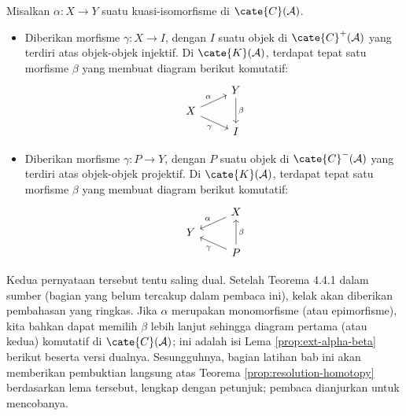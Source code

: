 \begin{teorema}\label{prop:resolution-homotopy}
	Misalkan $\alpha: X \to Y$ suatu kuasi-isomorfisme di $\cate{C}(\mathcal{A})$.
	\begin{itemize}
		\item Diberikan morfisme $\gamma: X \to I$, dengan $I$ suatu objek di $\cate{C}^+(\mathcal{A})$ yang terdiri atas objek-objek injektif. Di $\cate{K}(\mathcal{A})$, terdapat tepat satu morfisme $\beta$ yang membuat diagram berikut komutatif:
		\[\begin{tikzcd}[row sep=tiny]
			& Y \arrow[dd, "\beta"] \\
			X \arrow[ru, "\alpha"] \arrow[rd, "\gamma"'] & \\
			& I
		\end{tikzcd}\]
		\item Diberikan morfisme $\gamma: P \to Y$, dengan $P$ suatu objek di $\cate{C}^-(\mathcal{A})$ yang terdiri atas objek-objek projektif. Di $\cate{K}(\mathcal{A})$, terdapat tepat satu morfisme $\beta$ yang membuat diagram berikut komutatif:
		\[\begin{tikzcd}[row sep=tiny]
			& X \arrow[ld, "\alpha"'] \\
			Y & \\
			& P \arrow[lu, "\gamma"] \arrow[uu, "\beta"']
		\end{tikzcd}\]
	\end{itemize}
\end{teorema}

Kedua pernyataan tersebut tentu saling dual. Setelah Teorema 4.4.1 dalam sumber (bagian yang belum tercakup dalam pembaca ini), kelak akan diberikan pembahasan yang ringkas. Jika $\alpha$ merupakan monomorfisme (atau epimorfisme), kita bahkan dapat memilih $\beta$ lebih lanjut sehingga diagram pertama (atau kedua) komutatif di $\cate{C}(\mathcal{A})$; ini adalah isi Lema \ref{prop:ext-alpha-beta} berikut beserta versi dualnya. Sesungguhnya, bagian latihan bab ini akan memberikan pembuktian langsung atas Teorema \ref{prop:resolution-homotopy} berdasarkan lema tersebut, lengkap dengan petunjuk; pembaca dianjurkan untuk mencobanya.


